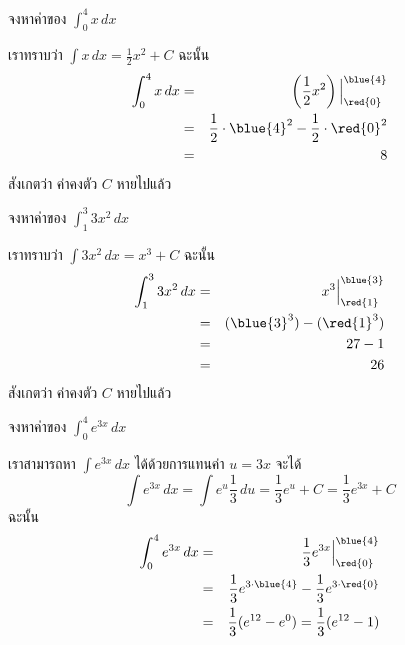 \begin{frame}[t]
\begin{ex}
จงหาค่าของ $\int_0^4 x\, dx$
\end{ex}
\begin{sol}
เราทราบว่า $\int x \,dx = \frac{1}{2}x^2 + C$ ฉะนั้น
\begin{eqnarray*}
\int_0^4 x\, dx &=& \left(\frac{1}{2}x^2\right) \Big|_{\red{0}}^{\blue{4}}  \\
&=& \frac{1}{2} \cdot \blue{4}^2 - \frac{1}{2} \cdot \red{0}^2 \\
&=& 8
\end{eqnarray*}
สังเกตว่า ค่าคงตัว $C$ หายไปแล้ว
\end{sol}
\end{frame}


\begin{frame}[t]
\begin{ex}
จงหาค่าของ $\int_1^3 3x^2  \, dx $
\end{ex}
\begin{sol}
เราทราบว่า $\int 3x^2 \, dx = x^3 + C$ ฉะนั้น
\begin{eqnarray*}
\int_1^3 3x^2  \, dx &=& x^3\Big|_{\red{1}}^{\blue{3}} \\ 
&=& (\blue{3}^3 ) - (\red{1}^3 ) \\
&=& 27 - 1 \\
&=& 26
\end{eqnarray*}
สังเกตว่า ค่าคงตัว $C$ หายไปแล้ว
\end{sol}
\end{frame}


\begin{frame}[t]
\begin{ex}
จงหาค่าของ $\int_0^4 e^{3x}\, dx$
\end{ex}
\begin{sol}
เราสามารถหา $\int e^{3x}\,dx$ ได้ด้วยการแทนค่า $u=3x$ จะได้
\[ \int e^{3x} \, dx = \int e^u \frac{1}{3} \, du = \frac{1}{3}e^u + C = \frac{1}{3}e^{3x} + C\]
ฉะนั้น
\begin{eqnarray*}
\int_0^4 e^{3x}\, dx &=& \frac{1}{3}e^{3x} \Big|_{\red{0}}^{\blue{4}}  \\
&=& \frac{1}{3}e^{3 \cdot \blue{4}} -  \frac{1}{3} e^{3 \cdot \red{0}} \\
&=& \frac{1}{3}(e^{12} - e^0) = \frac{1}{3}(e^{12}-1)
\end{eqnarray*}
\end{sol}
\end{frame}


